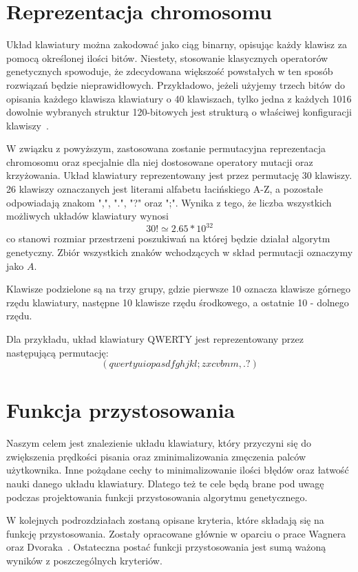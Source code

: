\documentclass[brudnopis]{xmgr}
\begin{document}
\section{Reprezentacja chromosomu}

Układ klawiatury można zakodować jako ciąg binarny, opisując każdy klawisz za pomocą określonej ilości bitów. Niestety, stosowanie klasycznych operatorów genetycznych spowoduje, że zdecydowana większość powstałych w ten sposób rozwiązań będzie nieprawidłowych. Przykładowo, jeżeli użyjemy trzech bitów do opisania każdego klawisza klawiatury o 40 klawiszach, tylko jedna z każdych 1016 dowolnie wybranych struktur 120-bitowych jest strukturą o właściwej konfiguracji klawiszy~\cite{GloverKey}.

W związku z powyższym, zastosowana zostanie permutacyjna reprezentacja chromosomu oraz specjalnie dla niej dostosowane operatory mutacji oraz krzyżowania. Układ klawiatury reprezentowany jest przez permutację 30 klawiszy. 26 klawiszy oznaczanych jest literami alfabetu łacińskiego A-Z, a pozostałe odpowiadają znakom ",", ".", "?" oraz ";". Wynika z tego, że liczba wszystkich możliwych układów klawiatury wynosi $$ 30! \simeq 2.65 * 10^{32} $$ co stanowi rozmiar przestrzeni poszukiwań na której będzie działał algorytm genetyczny. Zbiór wszystkich znaków wchodzących w skład permutacji oznaczymy jako $ A $.

Klawisze podzielone są na trzy grupy, gdzie pierwsze 10 oznacza klawisze górnego rzędu klawiatury, następne 10 klawisze rzędu środkowego, a ostatnie 10 - dolnego rzędu.

Dla przykładu, układ klawiatury QWERTY jest reprezentowany przez następującą permutację:
$$ (qwertyuiopasdfghjkl;zxcvbnm,.?) $$


\section{Funkcja przystosowania}

Naszym celem jest znalezienie układu klawiatury, który przyczyni się do zwiększenia prędkości pisania oraz zminimalizowania zmęczenia palców użytkownika. Inne pożądane cechy to minimalizowanie ilości błędów oraz łatwość nauki danego układu klawiatury. Dlatego też te cele będą brane pod uwagę podczas projektowania funkcji przystosowania algorytmu genetycznego.

W kolejnych podrozdziałach zostaną opisane kryteria, które składają się na funkcję przystosowania. Zostały opracowane głównie w oparciu o prace Wagnera~\cite{Eggers2003672} oraz Dvoraka~\cite{cassingham1986dvorak}. Ostateczna postać funkcji przystosowania jest sumą ważoną wyników z poszczególnych kryteriów.
\end{document}
